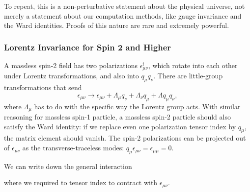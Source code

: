 \documentclass[11pt]{article}
\theoremstyle{definition}
\begin{document}
To repeat, this is a non-perturbative statement about the physical universe, not merely a statement about our computation methods, like gauge invariance and the Ward identities. Proofs of this nature are rare and extremely powerful.

\subsubsection{Lorentz Invariance for Spin 2 and Higher}
A massless spin-2 field has two polarizations $\epsilon_{\mu\nu}^i$, which rotate into each other under Lorentz transformations, and also into $q_\mu q_\nu$. There are little-group transformations that send
\begin{equation}
    \epsilon_{\mu\nu} \rightarrow \epsilon_{\mu\nu} + \Lambda_\mu q_\nu + \Lambda_\nu q_\mu + \Lambda q_\mu q_\nu,
\end{equation}
where $\Lambda_\mu$ has to do with the specific way the Lorentz group acts. With similar reasoning for massless spin-1 particle, a massless spin-2 particle should also satisfy the Ward identity: if we replace even one polarization tensor index by $q_\mu$, the matrix element should vanish. The spin-2 polarizations can be projected out of $\epsilon_{\mu\nu}$ as the transverse-traceless modes: $q_\mu \epsilon_{\mu\nu} = \epsilon_{\mu\mu} = 0$.

We can write down the general interaction
\begin{center}
\end{center}
where we required to tensor index to contract with $\epsilon_{\mu\nu}$.
\end{document}
